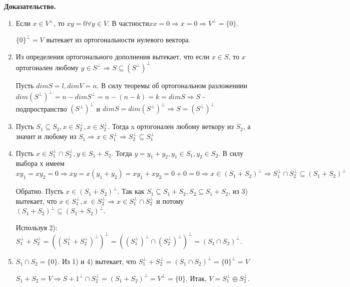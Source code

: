 \documentclass[a4paper]{article}
\begin{document}
    \begin{hproof}
        \textbf{Доказательство.}
        \begin{enumerate}
            \item Если $x \in V^{\bot}$, то $xy = 0 \forall y \in V$. В частности$xx = 0\Rightarrow x = 0 \Rightarrow V^{\bot} = \{ 0 \}$.

            $\{ 0 \}^{\bot} = V$ вытекает из ортогональности нулевого вектора.

            \item Из определения ортогонального дополнения вытекает, что если $x \in S$, то $x$ ортогонален любому $y \in S^{\bot} \Rightarrow S \subseteq (S^{\bot})^{\bot}$

            Пусть $dimS = l, dimV = n$. В силу теоремы об ортогональном разложениии $dim (S^{\bot})^{\bot} = n - dim S^{\bot} = n-(n-k) = k = dimS \Rightarrow S$ - подпространство $(S^{\bot})^{\bot}$ и $dimS = dim (S^{\bot})^{\bot} \Rightarrow S = (S^{\bot})^{\bot}$

            \item Пусть $S_1 \subseteq S_2, x \in S_2^{\bot}, x \in S_2^{\bot}$. Тогда x ортогонален любому веткору из $S_2$, а значит и любому из $S_1 \Rightarrow x \in S_1^{\bot} \Rightarrow S_2^{\bot} \subseteq S_1^{\bot}$

            \item Пусть $x \in S_1^{\bot} \cap S_2^{\bot}, y \in S_1+S_2$. Тогда $y=y_1+y_2, y_1 \in S_1, y_2 \in S_2$. В силу выбора х имеем $xy_1 = xy_2 = 0 \Rightarrow xy = x(y_1+y_2) = xy_1 + xy_2 = 0+0=0 \Rightarrow x \in (S_1 + S_2)^{\bot} \Rightarrow S_1^{\bot} \cap S_2^{\bot} \subseteq (S_1+S_2)^{\bot}$



            Обратно. Пусть $x \in (S_1+S_2)^{\bot}$. Так как $S_1 \subseteq S_1+S_2, S_2 \subseteq S_1+S_2$, из 3) вытекает, что $x \in S_1^{\bot}, x\ \in S_2^{\bot} \Rightarrow x \in S_1^{\bot} \cap S_2^{\bot}$ и потому $(S_1 + S_2)^{\bot} \subseteq (S_1+S_2)^{\bot}$.

            Используя 2): $S_1^{\bot} + S_2^{\bot} = ((S_1^{\bot} + S_2^{\bot})^{\bot})^{\bot} = ((S_1^{\bot})^{\bot} \cap (S_2^{\bot})^{\bot})^{\bot} = (S_1 \cap S_2)^{\bot}$.

            \item $S_1 \cap S_2 = \{ 0 \}$. Из 1) и 4) вытекает, что $S_1^{\bot} + S_2^{\bot} = (S_1 \cap S_2)^{\bot} = \{ 0 \}^{\bot} = V$

            $S_1+S_2 = V \Rightarrow S+1^{\bot} \cap S_2^{\bot} = (S_1 + S_2)^{\bot} = V^{\bot} = \{ 0 \}$. Итак, $V = S_1^{\bot} \oplus S_2^{\bot}$.
        \end{enumerate}
    \end{hproof}
\end{document}
